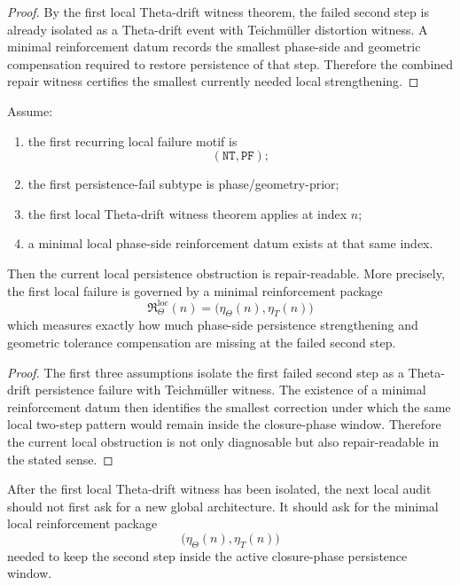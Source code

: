 \begin{proof}
By the first local Theta-drift witness theorem, the failed second step is already isolated as a Theta-drift event with Teichm\"uller distortion witness.
A minimal reinforcement datum records the smallest phase-side and geometric compensation required to restore persistence of that step.
Therefore the combined repair witness certifies the smallest currently needed local strengthening.
\end{proof}

\begin{theorem}
\label{thm:first-local-phase-side-repair-theorem}
Assume:
\begin{enumerate}
 \item the first recurring local failure motif is
 \[
 (\mathtt{NT},\mathtt{PF});
 \]
 \item the first persistence-fail subtype is phase/geometry-prior;
 \item the first local Theta-drift witness theorem applies at index $n$;
 \item a minimal local phase-side reinforcement datum exists at that same index.
\end{enumerate}
Then the current local persistence obstruction is repair-readable.
More precisely, the first local failure is governed by a minimal reinforcement package
\[
\mathfrak{R}_{\Theta}^{\mathrm{loc}}(n)
=
\bigl(
\eta_{\Theta}(n),
\eta_{T}(n)
\bigr)
\]
which measures exactly how much phase-side persistence strengthening and geometric tolerance compensation are missing at the failed second step.
\end{theorem}

\begin{proof}
The first three assumptions isolate the first failed second step as a Theta-drift persistence failure with Teichm\"uller witness.
The existence of a minimal reinforcement datum then identifies the smallest correction under which the same local two-step pattern would remain inside the closure-phase window.
Therefore the current local obstruction is not only diagnosable but also repair-readable in the stated sense.
\end{proof}

\begin{corollary}
\label{cor:current-post-r20-repair-rule}
After the first local Theta-drift witness has been isolated, the next local audit should not first ask for a new global architecture.
It should ask for the minimal local reinforcement package
\[
\bigl(
\eta_{\Theta}(n),
\eta_{T}(n)
\bigr)
\]
needed to keep the second step inside the active closure-phase persistence window.
\end{corollary}

